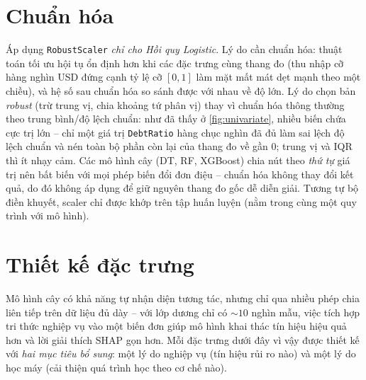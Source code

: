 \documentclass[12pt,a4paper,oneside]{report}
\theoremstyle{vnplain}
\theoremstyle{vndef}
\begin{document}
\section{Chuẩn hóa}\label{sec:scale}
Áp dụng \texttt{RobustScaler} \emph{chỉ cho Hồi quy Logistic}. Lý do cần chuẩn hóa:
thuật toán tối ưu hội tụ ổn định hơn khi các đặc trưng cùng thang đo (thu nhập cỡ hàng
nghìn USD đứng cạnh tỷ lệ cỡ $[0,1]$ làm mặt mất mát dẹt mạnh theo một chiều), và hệ số
sau chuẩn hóa so sánh được với nhau về độ lớn. Lý do chọn bản \emph{robust} (trừ trung
vị, chia khoảng tứ phân vị) thay vì chuẩn hóa thông thường theo trung bình/độ lệch
chuẩn: như đã thấy ở \cref{fig:univariate}, nhiều biến chứa cực trị lớn -- chỉ một
giá trị \texttt{DebtRatio} hàng chục nghìn đã đủ làm sai lệch độ lệch chuẩn và nén toàn
bộ phần còn lại của thang đo về gần 0; trung vị và IQR thì ít nhạy cảm. Các mô hình cây
(DT, RF, XGBoost) chia nút theo \emph{thứ tự} giá trị nên bất biến với mọi phép biến
đổi đơn điệu -- chuẩn hóa không thay đổi kết quả, do đó không áp dụng để giữ nguyên
thang đo gốc dễ diễn giải. Tương tự bộ điền khuyết, scaler chỉ được khớp trên tập huấn
luyện (nằm trong cùng một quy trình với mô hình).

\section{Thiết kế đặc trưng}\label{sec:fe}
Mô hình cây có khả năng tự nhận diện tương tác, nhưng chỉ qua nhiều phép chia liên tiếp trên dữ liệu
đủ dày -- với lớp dương chỉ có $\sim 10$ nghìn mẫu, việc tích hợp tri thức nghiệp vụ
vào một biến đơn giúp mô hình khai thác tín hiệu hiệu quả hơn và lời giải thích SHAP gọn hơn. Mỗi đặc trưng
dưới đây vì vậy được thiết kế với \emph{hai mục tiêu bổ sung}: một lý do nghiệp vụ (tín hiệu rủi ro
nào) và một lý do học máy (cải thiện quá trình học theo cơ chế nào).
\end{document}
